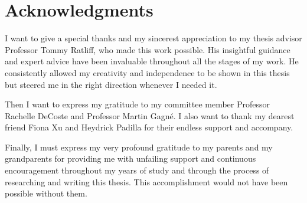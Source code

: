 \chapter{Acknowledgments}\label{chap:acknowledgements}
\par I want to give a special thanks and my sincerest appreciation to my thesis advisor Professor Tommy Ratliff, who made this work possible. His insightful guidance and expert advice have been invaluable throughout all the stages of my work. He consistently allowed my creativity and independence to be shown in this thesis but steered me in the right direction whenever I needed it.
\par Then I want to express my gratitude to my committee member Professor Rachelle DeCoste and Professor Martin Gagn\'{e}. I also want to thank my dearest friend Fiona Xu and Heydrick Padilla for their endless support and accompany.
\par Finally, I must express my very profound gratitude to my parents and my grandparents for providing me with unfailing support and continuous encouragement throughout my years of study and through the process of researching and writing this thesis. This accomplishment would not have been possible without them.